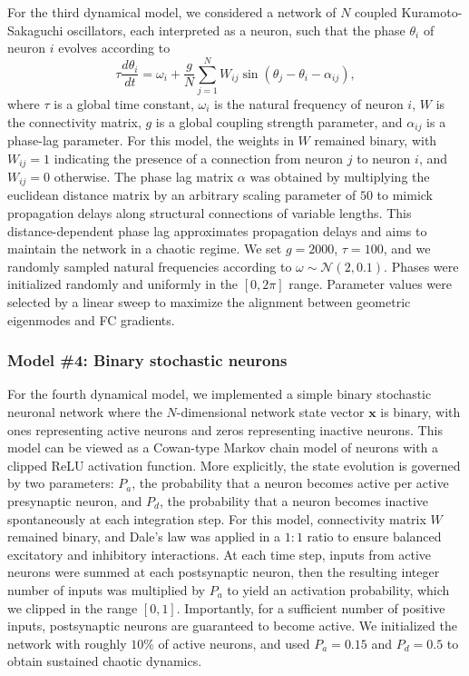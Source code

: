 \documentclass{article}
\begin{document}
For the third dynamical model, we considered a network of $N$ coupled Kuramoto-Sakaguchi oscillators, each interpreted as a neuron, such that the phase $\theta_i$ of neuron $i$ evolves according to \cite{sakaguchi1986soluble}
$$
    \tau\frac{d\theta_i}{dt}=\omega_i+ \frac{g}{N}\sum_{j=1}^N W_{ij}\sin(\theta_j - \theta_i - \alpha_{ij}),
$$
where $\tau$ is a global time constant, $\omega_i$ is the natural frequency of neuron $i$, $W$ is the connectivity matrix, $g$ is a global coupling strength parameter, and $\alpha_{ij}$ is a phase-lag parameter. For this model, the weights in $W$ remained binary, with $W_{ij} = 1$ indicating the presence of a connection from neuron $j$ to neuron $i$, and $W_{ij} = 0$ otherwise. The phase lag matrix $\alpha$ was obtained by multiplying the euclidean distance matrix by an arbitrary scaling parameter of $50$ to mimick propagation delays along structural connections of variable lengths\cite{fukushima2018comparison}. This distance-dependent phase lag approximates propagation delays and aims to maintain the network in a chaotic regime. We set $g=2000$, $\tau=100$, and we randomly sampled natural frequencies according to $\omega \sim \mathcal{N}(2, 0.1)$. Phases were initialized randomly and uniformly in the $[0, 2\pi]$ range. Parameter values were selected by a linear sweep to maximize the alignment between geometric eigenmodes and FC gradients.

\subsubsection*{Model \#4: Binary stochastic neurons}

For the fourth dynamical model, we implemented a simple binary stochastic neuronal network where the $N$-dimensional network state vector $\textbf{x}$ is binary, with ones representing active neurons and zeros representing inactive neurons. This model can be viewed as a Cowan-type Markov chain model of neurons \cite{painchaud2022beyond, murphy2024duality} with a clipped ReLU activation function. More explicitly, the state evolution is governed by two parameters: $P_a$, the probability that a neuron becomes active per active presynaptic neuron, and $P_d$, the probability that a neuron becomes inactive spontaneously at each integration step. For this model, connectivity matrix $W$ remained binary, and Dale's law was applied in a $1:1$ ratio to ensure balanced excitatory and inhibitory interactions. At each time step, inputs from active neurons were summed at each postsynaptic neuron, then the resulting integer number of inputs was multiplied by $P_a$ to yield an activation probability, which we clipped in the range $[0, 1]$. Importantly, for a sufficient number of positive inputs, postsynaptic neurons are guaranteed to become active. We initialized the network with roughly $10\%$ of active neurons, and used $P_a=0.15$ and $P_d=0.5$ to obtain sustained chaotic dynamics.
\end{document}
